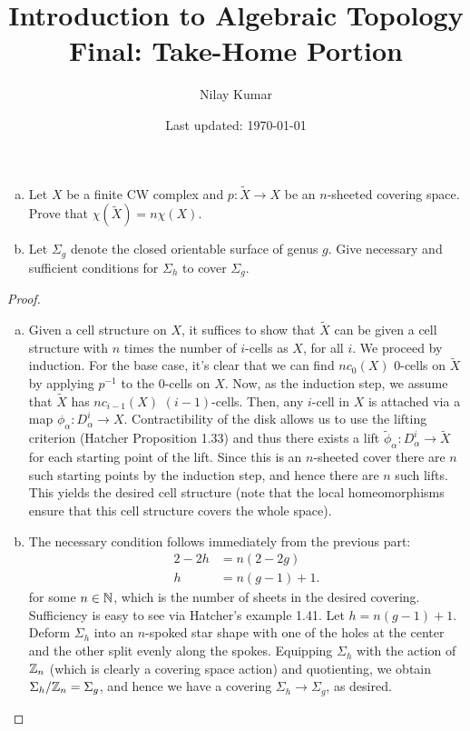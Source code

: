 \documentclass{../mathnotes}
\title{Introduction to Algebraic Topology Final: Take-Home Portion}
\author{Nilay Kumar}
\date{Last updated: \today}
\begin{document}
\maketitle

\begin{prop}\hfill
    \begin{enumerate}[(a)]
        \item Let $X$ be a finite CW complex and $p:\tilde X\to X$ be an $n$-sheeted covering space.
            Prove that $\chi(\tilde X)=n\chi(X)$.
        \item Let $\Sigma_g$ denote the closed orientable surface of genus $g$. Give necessary and
            sufficient conditions for $\Sigma_h$ to cover $\Sigma_g$.
    \end{enumerate}
\end{prop}
\begin{proof}\hfill
    \begin{enumerate}[(a)]
        \item Given a cell structure on $X$, it suffices to show that $\tilde X$ can be given a cell structure with
            $n$ times the number of $i$-cells as $X$, for all $i$. We proceed by induction. For the base case,
            it's clear that we can find $nc_0(X)$ 0-cells on $\tilde X$ by applying $p^{-1}$ to the 0-cells on $X$.
            Now, as the induction
            step, we assume that $\tilde X$ has $nc_{i-1}(X)$ $(i-1)$-cells. Then, any $i$-cell in $X$ is attached via
            a map $\phi_\alpha: D^i_\alpha\to X$. Contractibility of the disk allows us to use the lifting criterion
            (Hatcher Proposition 1.33) and thus there exists a lift $\tilde\phi_\alpha:D^i_\alpha\to \tilde X$ for each
            starting point of the lift. Since this is an $n$-sheeted cover there are $n$ such starting points by the
            induction step, and hence there are $n$ such lifts. This yields the desired cell structure (note that the
            local homeomorphisms ensure that this cell structure covers the whole space). 
        \item The necessary condition follows immediately from the previous part:
            \begin{align*}
                2-2h &= n(2-2g)\\
                h &= n(g-1)+1.
            \end{align*}
            for some $n\in\mathbb{N}$, which is the number of sheets in the desired covering. Sufficiency is easy to see via
            Hatcher's example 1.41. Let $h=n(g-1)+1$. Deform $\Sigma_h$ into an $n$-spoked star shape with one of the
            holes at the center and the other split evenly along the spokes. Equipping $\Sigma_h$ with the action of
            $\mathbb{Z}_n$ (which is clearly a covering space action) and quotienting, we obtain $\Sigma_h/\mathbb{Z}_n=\Sigma_g$,
            and hence we have a covering $\Sigma_h\to \Sigma_g$, as desired.
    \end{enumerate}
\end{proof}
\end{document}
